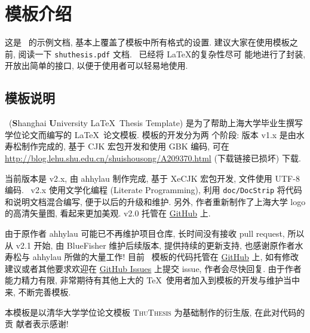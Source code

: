 \chapter{模板介绍}
\label{cha:intro}

这是 \shuthesis\ 的示例文档, 基本上覆盖了模板中所有格式的设置. 建议大家在使用模板之
前, 阅读一下 \texttt{shuthesis.pdf} 文档. \shuthesis\ 已经将 \LaTeX 的复杂性尽可
能地进行了封装, 开放出简单的接口, 以便于使用者可以轻易地使用.
 
\section{模板说明}
\shuthesis\ (\textbf{S}hanghai \textbf{U}niversity \LaTeX\ Thesis Template) 
是为了帮助上海大学毕业生撰写学位论文而编写的 \LaTeX\ 论文模板. 模板的开发分为两
个阶段: 版本 v1.x 是由水寿松制作完成的, 基于 CJK 宏包开发和使用 GBK 编码, 可在
\url{http://blog.lehu.shu.edu.cn/shuishousong/A209370.html} (下载链接已损坏) 下载. 

当前版本是 v2.x, 由 ahhylau 制作完成, 基于 XeCJK 宏包开发, 文件使用 UTF-8 编码. 
\shuthesis\ v2.x 使用文学化编程 (Literate Programming), 利用 \texttt{doc/DocStrip} 
将代码和说明文档混合编写, 便于以后的升级和维护. 另外, 作者重新制作了上海大学 
logo 的高清矢量图, 看起来更加美观. v2.0 托管在 \href{https://github.com/ahhylau/shuthesis}{GitHub} 上.

由于原作者 ahhylau 可能已不再维护项目仓库, 长时间没有接收 pull request, 所以从 v2.1 开始, 由 BlueFisher 维护后续版本, 提供持续的更新支持, 也感谢原作者水寿松与 ahhylau 所做的大量工作! 目前 \shuthesis\ 模板的代码托管在 \href{https://github.com/BlueFisher/shuthesis}{GitHub} 上, 如有修改建议或者其他要求欢迎在 \href{https://github.com/BlueFisher/shuthesis/issues}{GitHub Issues} 上提交 issue, 作者会尽快回复. 由于作者能力精力有限, 非常期待有其他上大的 \TeX\ 使用者加入到模板的开发与维护当中来, 不断完善模板.

本模板是以清华大学学位论文模板 \textsc{ThuThesis} 为基础制作的衍生版, 在此对代码的贡
献者表示感谢!


